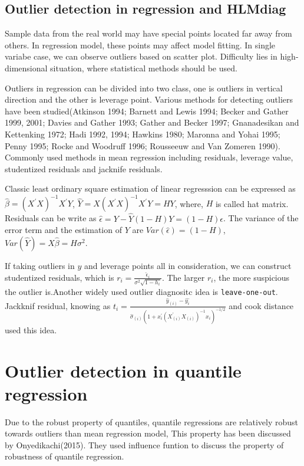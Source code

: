 \documentclass[11pt,a4paper,]{article}
\theoremstyle{definition}
\theoremstyle{definition}
\theoremstyle{remark}
\begin{document}
\subsection{Outlier detection in regression and
HLMdiag}\label{outlier-detection-in-regression-and-hlmdiag}

Sample data from the real world may have special points located far away
from others. In regression model, these points may affect model fitting.
In single variabe case, we can observe outliers based on scatter plot.
Difficulty lies in high-dimensional situation, where statistical methods
should be used.

Outliers in regression can be divided into two class, one is outliers in
vertical direction and the other is leverage point. Various methods for
detecting outliers have been studied(Atkinson 1994; Barnett and Lewis
1994; Becker and Gather 1999, 2001; Davies and Gather 1993; Gather and
Becker 1997; Gnanadesikan and Kettenking 1972; Hadi 1992, 1994; Hawkins
1980; Maronna and Yohai 1995; Penny 1995; Rocke and Woodruff 1996;
Rousseeuw and Van Zomeren 1990). Commonly used methods in mean
regression including residuals, leverage value, studentized residuals
and jacknife residuals.

Classic least ordinary square estimation of linear regresssion can be
expressed as \(\hat{\beta}=(X^{'}X)^{-1}X^{'}Y\),
\(\hat{Y}=X(X^{'}X)^{-1}X^{'}Y=HY\), where, \(H\) is called hat matrix.
Residuals can be write as
\(\hat{\epsilon}=Y-\hat{Y}(1-H)Y=(1-H)\epsilon\). The variance of the
error term and the estimation of \(Y\) are
\(Var(\hat{\epsilon})=(1-H)\),
\(Var(\hat{Y})=X\hat{\beta}=H\sigma^{2}\).

If taking outliers in \(y\) and leverage points all in consideration, we
can construct studentized residuals, which is
\(r_i=\frac{\hat{\epsilon}_{i}}{\sigma^{2}\sqrt{1-h_i}}\). The larger
\(r_i\), the more suspicious the outlier is.Another widely used outlier
diagnositc idea is \texttt{leave-one-out}. Jackknif residual, knowing as
\(t_i=\frac{\hat{y}_{(i)}-\hat{y_i}}{\hat{\sigma}_{(i)}(1+x^{'}_{i}(X^{'}_{(i)}X_{(i)})^{-1}x_{i})^{-1/2}}\)
and cook distance used this idea.

\section{Outlier detection in quantile
regression}\label{outlier-detection-in-quantile-regression}

Due to the robust property of quantiles, quantile regressions are
relatively robust towards outliers than mean regression model, This
property has been discussed by Onyedikachi(2015). They used influence
funtion to discuss the property of robustness of quantile regression.
\end{document}
